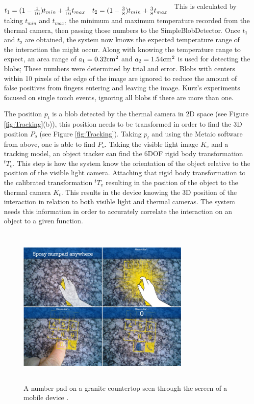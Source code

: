 \documentclass{sig-alternate}
\begin{document}
\(
\begin{matrix} \\
 t_{1}=(1-{1\over 16})t_{ min}+{1\over 16}t_{ max} & t_{2}=(1-{3\over 8})t_{ min}+{3\over 8}t_{ max}\cr 
 \end{matrix} \\\\
\)
This is calculated by taking \(t_{min}\) and \(t_{max}\), the minimum and maximum temperature recorded from the thermal camera, then passing those numbers to the SimpleBlobDetector. Once \(t_1\) and \(t_2\) are obtained, the system now knows the expected temperature range of the interaction the might occur. Along with knowing the temperature range to expect, an area range of \(a_{1}=0.32{\rm cm}^{2}\) and \(a_{2}=1.54{\rm cm}^{2}\) is used for detecting the blobs; These numbers were determined by trial and error. Blobs with centers within 10 pixels of the edge of the image are ignored to reduce the amount of false positives from fingers entering and leaving the image. Kurz's experiments focused on single touch events, ignoring all blobs if there are more than one.

The position \(p_t\) is a blob detected by the thermal camera in 2D space (see Figure \ref{fig:Tracking}(b)), this position needs to be transformed in order to find the 3D position \(P_o\) (see Figure \ref{fig:Tracking}). Taking \(p_t\) and using the Metaio software from above, one is able to find \(P_o\). Taking the visible light image \(K_v\) and a tracking model, an object tracker can find the 6DOF rigid body transformation \({^t}T_o\). This step is how the system know the orientation of the object relative to the position of the visible light camera. Attaching that rigid body transformation to the calibrated transformation \({^t}T_v\) resulting in the position of the object to the thermal camera \(K_t\). This results in the device knowing the 3D position of the interaction in relation to both visible light and thermal cameras. The system needs this information in order to accurately correlate the interaction on an object to a given function.    
 
\begin{figure}
	\includegraphics[width=8.5cm, height=8cm]{numpad}
	\caption{A number pad on a granite countertop seen through the screen of a mobile device \cite{Thermal}.}
	\label{fig:numpad}
\end{figure}
\end{document}
